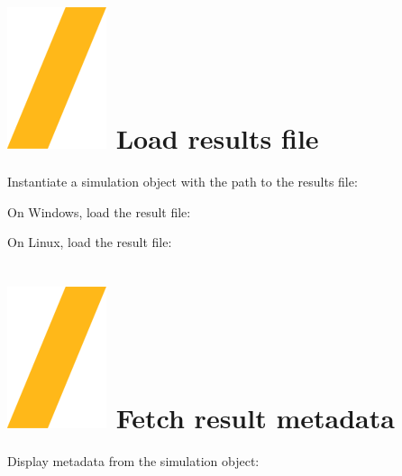 \documentclass[9pt,landscape]{article}
\begin{document}
\begin{multicols}{3}
\setlength{\premulticols}{1pt}
\setlength{\postmulticols}{1pt}
\setlength{\multicolsep}{1pt}
\setlength{\columnsep}{2pt}

\vfill
\section{\includegraphics[height=\fontcharht\font`\S]{slash.png} Load results file}

Instantiate a simulation object with the path to the results file: 

\vspace{2mm} %

On Windows, load the result file:


On Linux, load the result file:


\section{\includegraphics[height=\fontcharht\font`\S]{slash.png} Fetch result metadata}

Display metadata from the simulation object:



\end{multicols}
\end{document}
